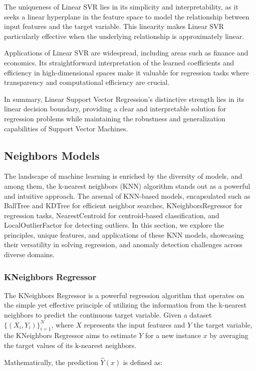 \documentclass[twocolumn]{article}
\begin{document}
The uniqueness of Linear SVR lies in its simplicity and interpretability, as it seeks a linear hyperplane in the feature space to model the relationship between input features and the target variable. This linearity makes Linear SVR particularly effective when the underlying relationship is approximately linear.

Applications of Linear SVR are widespread, including areas such as finance and economics. Its straightforward interpretation of the learned coefficients and efficiency in high-dimensional spaces make it valuable for regression tasks where transparency and computational efficiency are crucial.

In summary, Linear Support Vector Regression's distinctive strength lies in its linear decision boundary, providing a clear and interpretable solution for regression problems while maintaining the robustness and generalization capabilities of Support Vector Machines.

	\subsection{Neighbors Models}
The landscape of machine learning is enriched by the diversity of models, and among them, the k-nearest neighbors (KNN) algorithm stands out as a powerful and intuitive approach. The arsenal of KNN-based models, encapsulated such as BallTree and KDTree for efficient neighbor searches, KNeighborsRegressor for regression tasks, NearestCentroid for centroid-based classification, and LocalOutlierFactor for detecting outliers. In this section, we explore the principles, unique features, and applications of these KNN models, showcasing their versatility in solving regression, and anomaly detection challenges across diverse domains.
		\subsubsection{KNeighbors Regressor}
The KNeighbors Regressor is a powerful regression algorithm that operates on the simple yet effective principle of utilizing the information from the k-nearest neighbors to predict the continuous target variable. Given a dataset \(\{(X_i, Y_i)\}_{i=1}^{N}\), where \(X\) represents the input features and \(Y\) the target variable, the KNeighbors Regressor aims to estimate \(Y\) for a new instance \(x\) by averaging the target values of its k-nearest neighbors.

Mathematically, the prediction \(\hat{Y}(x)\) is defined as:
\end{document}
